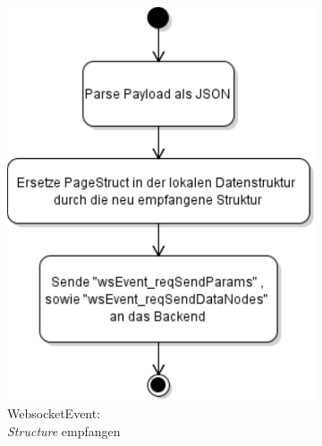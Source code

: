\begin{figure}[ht]
\begin{subfigure}[b]{0.38\textwidth}
      \includegraphics[width=\textwidth]{content/hauptteil/systemEntwurf/res/wsHandler/frontend/wsEvent_structure.pdf}
      \caption{WebsocketEvent:\\\emph{Structure} empfangen}
      \label{fig:aDDF:wsEvent_structure}
  \end{subfigure}
  \hfill
  \begin{subfigure}[b]{0.30\textwidth}
      \centering

\end{subfigure}
\end{figure}

